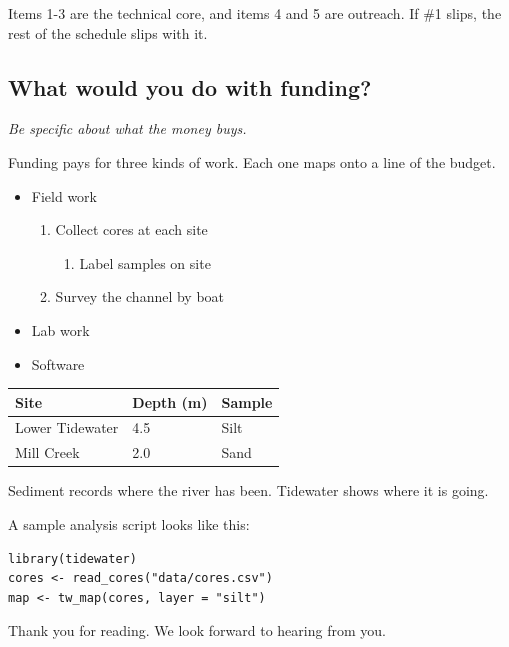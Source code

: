 Items 1-3 are the technical core, and items 4 and 5 are outreach. If \#1 slips, the rest of the schedule slips with it.

\subsection{What would you do with funding?}

\emph{Be specific about what the money buys.}

Funding pays for three kinds of work. Each one maps onto a line of the budget.

\begin{itemize}
  \item Field work
  \begin{enumerate}
    \item Collect cores at each site
    \begin{enumerate}
      \item Label samples on site
    \end{enumerate}
    \item Survey the channel by boat
  \end{enumerate}
  \item Lab work
  \item Software
\end{itemize}

\begin{tabular}{l l l}
Site & Depth (m) & Sample \\
\hline
Lower Tidewater & 4.5 & Silt \\
Mill Creek & 2.0 & Sand \\
\end{tabular}

Sediment records where the river has been. Tidewater shows where it is going.

A sample analysis script looks like this:

\begin{verbatim}
library(tidewater)
cores <- read_cores("data/cores.csv")
map <- tw_map(cores, layer = "silt")
\end{verbatim}

Thank you for reading. We look forward to hearing from you.
